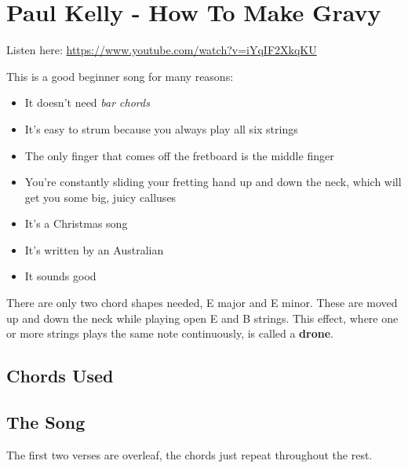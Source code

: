 \documentclass{article}
\begin{document}
\setlength{\parindent}{0pt}


\section{Paul Kelly - How To Make Gravy}

Listen here: \url{https://www.youtube.com/watch?v=iYqIF2XkqKU}

This is a good beginner song for many reasons:

\begin{itemize}
    \item It doesn't need \textit{bar chords}
    \item It's easy to strum because you always play all six strings
    \item The only finger that comes off the fretboard is the middle finger
    \item You're constantly sliding your fretting hand up and down the neck, which will get you some big, juicy calluses
    \item It's a Christmas song
    \item It's written by an Australian
    \item It sounds good
\end{itemize}


There are only two chord shapes needed, E major and E minor.  These are moved up and down the neck while playing open E and B strings.  This effect, where one or more strings plays the same note continuously, is called a \textbf{drone}.

\subsection{Chords Used}

\def\numfrets{5}
\mediumchords


\subsection{The Song}

The first two verses are overleaf, the chords just repeat throughout the rest.

\bigskip
\end{document}
